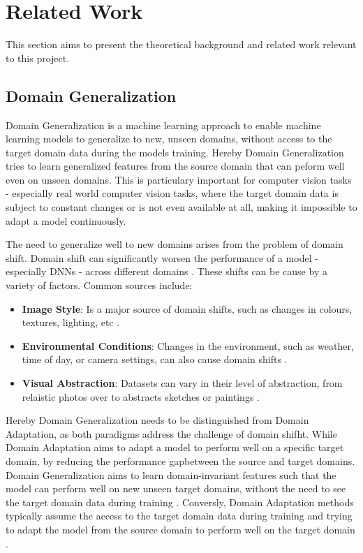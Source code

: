 \section{Related Work}
This section aims to present the theoretical background and related work relevant to this project.

\subsection{Domain Generalization}

Domain Generalization is a machine learning approach to enable machine learning models to generalize to new, unseen domains, without  access to the target domain data during the models training. Hereby Domain Generalization tries to learn generalized features from the source domain that can peform well even on unseen domains. This is particulary important for computer vision tasks - especially real world computer vision tasks, where the target domain data is subject to constant changes or is not even available at all, making it impossible to adapt a model continuously. \cite{liDeeperBroaderArtier2017,liuDEJAVUContinual2023}

The need to generalize well to new domains arises from the problem of domain shift. Domain shift can significantly worsen the performance of a model - especially DNNs - across different domains \cite{muandetDomainGeneralizationInvariant2013}. These shifts can be cause by a variety of factors. Common sources include:
\begin{itemize}
    \item \textbf{Image Style}: Is a major source of domain shifts, such as changes in colours, textures, lighting, etc \cite{zhouMixStyleNeuralNetworks2023}.
    \item \textbf{Environmental Conditions}: Changes in the environment, such as weather, time of day, or camera settings, can also cause domain shifts \cite{schwonbergAugmentationbasedDomainGeneralization2023}.
    \item \textbf{Visual Abstraction}: Datasets can vary in their level of abstraction, from relaistic photos over to abstracts sketches or paintings \cite{liDeeperBroaderArtier2017}.
\end{itemize}



Hereby Domain Generalization needs to be distinguished from Domain Adaptation, as both paradigms address the challenge of domain shifht. While Domain Adaptation aims to adapt a model to perform well on a specific target domain, by reducing the performance gapbetween the source and target domains. Domain Generalization aims to learn domain-invariant features such that the model can perform well on new unseen target domains, without the need to see the target domain data during training \cite{liDeeperBroaderArtier2017}. Conversly, Domain Adaptation methods typically assume the access to the target domain data during training and trying to adapt the model from the source domain to perform well on the target domain \cite{liuDEJAVUContinual2023}. %

